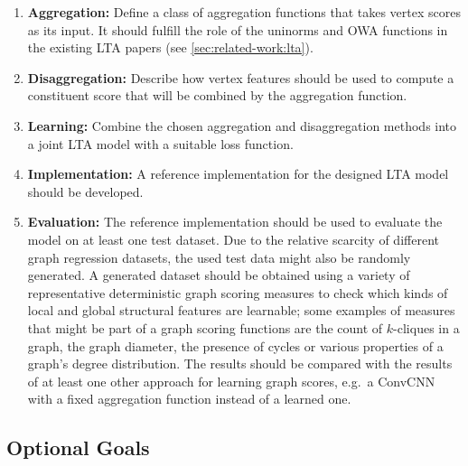 \documentclass[12pt]{scrartcl}
\begin{document}
\begin{enumerate}[label=\textbf{\arabic*.}]
	\item \textbf{Aggregation:}
		Define a class of aggregation functions that takes vertex scores as its input.
		It should fulfill the role of the uninorms and OWA functions in the existing LTA papers (see \cref{sec:related-work:lta}).
	\item \textbf{Disaggregation:}
		Describe how vertex features should be used to compute a constituent score that will be combined by the aggregation function.
	\item \textbf{Learning:}
		Combine the chosen aggregation and disaggregation methods into a joint LTA model with a suitable loss function.
	\item \textbf{Implementation:}
		A reference implementation for the designed LTA model should be developed.
	\item \textbf{Evaluation:}
		The reference implementation should be used to evaluate the model on at least one test dataset.
		Due to the relative scarcity of different graph regression datasets, the used test data might also be randomly generated.
		A generated dataset should be obtained using a variety of representative deterministic graph scoring measures to check which kinds of local and global structural features are learnable;
		some examples of measures that might be part of a graph scoring functions are the count of $k$-cliques in a graph, the graph diameter, the presence of cycles or various properties of a graph's degree distribution.
		The results should be compared with the results of at least one other approach for learning graph scores, e.g.\ a ConvCNN with a fixed aggregation function instead of a learned one.
\end{enumerate}

\subsection{Optional Goals}%
\label{sec:goals:opt}
\end{document}
